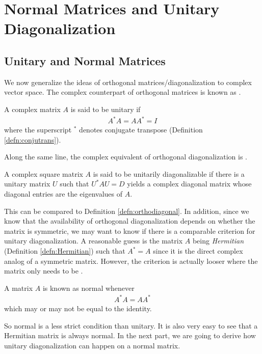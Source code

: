 \section{Normal Matrices and Unitary Diagonalization}

\subsection{Unitary and Normal Matrices} 
We now generalize the ideas of orthogonal matrices/diagonalization to complex vector space. The complex counterpart of orthogonal matrices is known as .
\begin{defn}
\label{defn:unitary}
A complex matrix $A$ is said to be unitary if
\begin{align*}
A^*A = AA^* = I
\end{align*}
where the superscript $^*$ denotes conjugate transpose (Definition \ref{defn:conjutrans}).
\end{defn}
Along the same line, the complex equivalent of orthogonal diagonalization is .
\begin{defn}
\label{defn:unitarydiag}
A complex square matrix $A$ is said to be unitarily diagonalizable if there is a unitary matrix $U$ such that $U^* AU = D$ yields a complex diagonal matrix whose diagonal entries are the eigenvalues of $A$.
\end{defn}
This can be compared to Definition \ref{defn:orthodiagonal}. In addition, since we know that the availability of orthogonal diagonalization depends on whether the matrix is symmetric, we may want to know if there is a comparable criterion for unitary diagonalization. A reasonable guess is the matrix $A$ being \textit{Hermitian} (Definition \ref{defn:Hermitian}) such that $A^* = A$ since it is the direct complex analog of a symmetric matrix. However, the criterion is actually looser where the matrix only needs to be .
\begin{defn}
A matrix $A$ is known as normal whenever
\begin{align*}
A^*A = AA^*    
\end{align*}
which may or may not be equal to the identity.
\end{defn}
So normal is a less strict condition than unitary. It is also very easy to see that a Hermitian matrix is always normal. In the next part, we are going to derive how unitary diagonalization can happen on a normal matrix.

